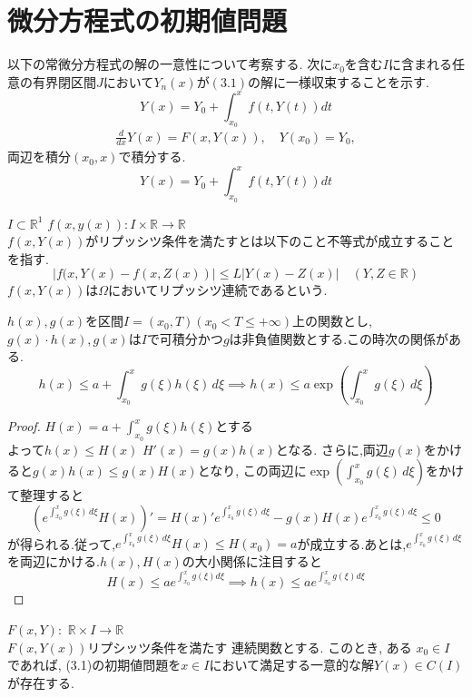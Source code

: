 \documentclass[12pt,xelatex,ja=standard]{bxjsarticle}
\begin{document}
\section{微分方程式の初期値問題}
\label{sec:微分方程式の初期値問題}
   以下の常微分方程式の解の一意性について考察する.
       次に$x_{0}$を含む$I$に含まれる任意の有界閉区間$J$において$Y_{n}(x)$が$(3.1)$の解に一様収束することを示す.
       \[Y(x)=Y_{0}+\displaystyle \int_{x_{0}}^{x} f(t,Y(t)) dt\]
   \begin{align}
\frac{d}{dx}Y(x) = F(x, Y(x)), \quad Y(x_{0}) = Y_{0},
   \end{align}
   両辺を積分$(x_{0},x)$で積分する.
   \[Y(x)=Y_{0}+\displaystyle \int_{x_{0}}^{x} f(t,Y(t)) dt\]
\begin{Definition}[リプッシツ条件]
$I \subset \mathbb{R}^{1}$
$f(x,y(x)): I \times \mathbb{R} \to \mathbb{R}$\\
$f(x,Y(x))$がリプッシツ条件を満たすとは以下のこと不等式が成立することを指す.
\[
|f(x, Y(x) - f(x, Z(x))| \leq L |Y(x) - Z(x)| \quad (Y,Z \in \mathbb{R}) 
\]
$f(x,Y(x))$は$\Omega$においてリプッシツ連続であるという.
\end{Definition}
\begin{Lemma}[グロンウォールの不等式]
    $h(x),g(x)$を区間$I=(x_{0},T)(x_{0}<T\leq +\infty)$上の関数とし,$g(x)\cdot h(x),g(x)$は$I$で可積分かつ$g$は非負値関数とする.この時次の関係がある.
\[
h(x) \leq a + \int_{x_0}^x g(\xi) h(\xi) \, d\xi \implies 
h(x) \leq a \exp\left(\int_{x_0}^x g(\xi) \, d\xi\right)
\]
\end{Lemma}
\begin{proof}
    $H(x)=a+\displaystyle\int_{x_0}^x g(\xi) h(\xi)$とする\\
    よって$h(x)\leq H(x)$
    $H'(x)=g(x)h(x)$となる.
    さらに,両辺$g(x)$をかけると$g(x)h(x)\leq g(x)H(x)$となり, この両辺に$\exp\left(\int_{x_0}^x g(\xi) \, d\xi\right)$をかけて整理すると
    \[\left(e^{\int_{x_0}^x g(\xi) \, d\xi}H(x)\right)'=H(x)'e^{\int_{x_0}^x g(\xi) \, d\xi}-g(x)H(x)e^{\int_{x_0}^x g(\xi) \, d\xi} \leq 0\]
    が得られる.従って,$e^{\int_{x_0}^x g(\xi) \, d\xi}H(x) \leq H(x_{0})=a$が成立する.あとは,$e^{\int_{x_0}^x g(\xi) \, d\xi}$を両辺にかける.$h(x),H(x)$の大小関係に注目すると
    \[H(x) \leq ae^{\int_{x_{0}}^{x} g(\xi) d\xi} \implies h(x) \leq ae^{\int_{x_{0}}^{x} g(\xi) d\xi}\]
\end{proof}
\begin{Theorem}
        
$F(x, Y):$  $\mathbb{R}\times I \to \mathbb{R}$ \\
$F(x,Y(x))$リプシッツ条件を満たす 連続関数とする.
このとき, ある $x_0 \in I$ であれば, (3.1)の初期値問題を$x \in I$において満足する一意的な解$Y(x)\in C(I)$が存在する.
\end{Theorem}
\end{document}
